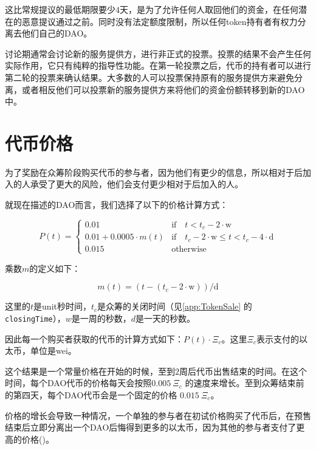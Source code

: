 \documentclass[9pt,oneside]{amsart}
\begin{document}
\begin{multicols}{2}
这比常规提议的最低期限要少$4$天，是为了允许任何人取回他们的资金，在任何潜在的恶意提议通过之前。同时没有法定额度限制，所以任何token持有者有权力分离去他们自己的DAO。

讨论期通常会讨论新的服务提供方，进行非正式的投票。投票的结果不会产生任何实际作用，它只有纯粹的指导性功能。在第一轮投票之后，代币的持有者可以进行第二轮的投票来确认结果。大多数的人可以投票保持原有的服务提供方来避免分离，或者相反他们可以投票新的服务提供方来将他们的资金份额转移到新的DAO中。


\section{代币价格} \label{TokenPrice}

为了奖励在众筹阶段购买代币的参与者，因为他们有更少的信息，所以相对于后加入的人承受了更大的风险，他们会支付更少相对于后加入的人。

就现在描述的DAO而言，我们选择了以下的价格计算方式：

\begin{equation}
 P(t) = \begin{cases}
0.01 & \text{if} \quad t < t_c - 2 \cdot \text{w} \\
0.01 + 0.0005 \cdot m(t) & \text{if} \quad t_c - 2 \cdot \text{w} \leqslant t < t_c - 4 \cdot \text{d} \\
0.015 & \text{otherwise}
\end{cases}
\end{equation}

乘数$m$的定义如下：

\begin{equation}
 m(t) = (t - (t_c - 2 \cdot \text{w})) / \text{d}
\end{equation}

这里的$t$是unit秒时间，$t_c$是众筹的关闭时间（见\ref{app:TokenSale} 的\verb|closingTime|），$w$是一周的秒数，$d$是一天的秒数。

因此每一个购买者获取的代币的计算方式如下：$P(t) \cdot \Xi_c$。这里$\Xi_c$表示支付的以太币，单位是wei。

这个结果是一个常量价格在开始的时候，至到$2$周后代币出售结束的时间。在这个时间，每个DAO代币的价格每天会按照$0.005 \: \Xi_c$ 的速度来增长。至到众筹结束前的第四天，每个DAO代币会是一个固定的价格 $0.015 \: \Xi_c$。

价格的增长会导致一种情况，一个单独的参与者在初试价格购买了代币后，在预售结束后立即分离出一个DAO后悔得到更多的以太币，因为其他的参与者支付了更高的价格(\cite{GriffDiscussion})。


\end{multicols}
\end{document}
